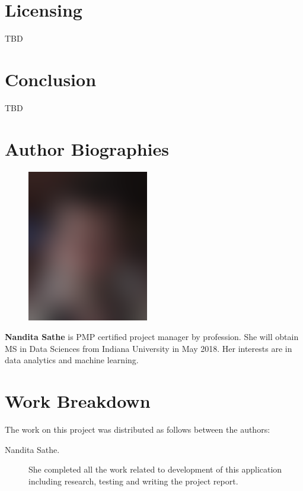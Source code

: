 \documentclass[9pt,twocolumn,twoside]{styles/osajnl}
\begin{document}
\section {Licensing}

TBD

\section {Conclusion}

TBD



 
\section*{Author Biographies}
\begingroup
\setlength\intextsep{0pt}
\begin{minipage}[t][3.2cm][t]{1.0\columnwidth} %
  \begin{figure}
    \includegraphics[width=0.25\columnwidth]{images/john_smith.eps}
  \end{figure}
  \noindent
  {\bfseries Nandita Sathe} is PMP certified project manager by profession. She will obtain MS in Data Sciences from Indiana University in May 2018. Her interests are in data analytics and machine learning.
\end{minipage}
\endgroup

\newpage

\section{Work Breakdown}

The work on this project was distributed as follows between the
authors:

\begin{description}

\item[Nandita Sathe.] She completed all the work related to development of this   application including research, testing and writing the project report. 

\end{description}
\end{document}

